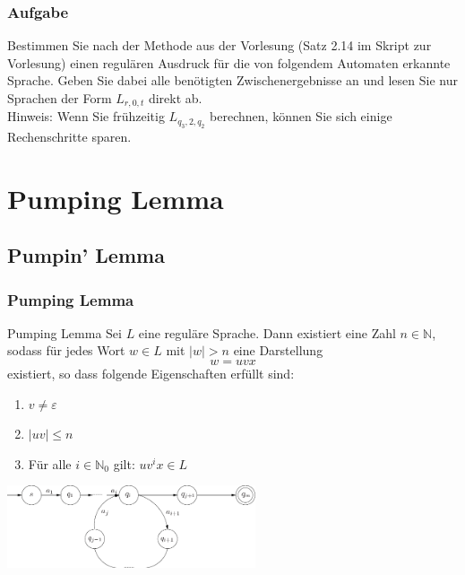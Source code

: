 \begin{frame}
\frametitle{Aufgabe}
Bestimmen Sie nach der Methode aus der Vorlesung (Satz 2.14 im Skript zur Vorlesung) einen
regulären Ausdruck für die von folgendem Automaten erkannte Sprache. Geben Sie dabei alle benötigten Zwischenergebnisse an und lesen Sie nur Sprachen der Form $L_{r,0,t}$ direkt ab.
\\ Hinweis: Wenn Sie frühzeitig $L_{q_3, 2, q_2}$ berechnen, können Sie sich einige Rechenschritte sparen.
\begin{figure}[H]
\begin{center}
\end{center}
\end{figure}
\end{frame}

\section{Pumping Lemma}
\subsection{Pumpin' Lemma}
\begin{frame}
\frametitle{Pumping Lemma}
\begin{exampleblock}{Pumping Lemma}
Sei $L$ eine reguläre Sprache. Dann existiert eine Zahl $n \in \mathbb{N}$, sodass für jedes Wort $w \in L$ mit $\left|w \right| > n$ eine Darstellung $$w = uvx$$ existiert, so dass folgende Eigenschaften erfüllt sind:

\begin{enumerate}
\item $v \neq \varepsilon$ 
\item $\left|uv\right| \leq n$ 
\item Für alle $i \in \mathbb{N}_0$ gilt: $uv^ix \in L$
\end{enumerate}
\end{exampleblock}

\begin{center}
\includegraphics[width=0.55\textwidth]{images/Q116}
\end{center}

\end{frame}

